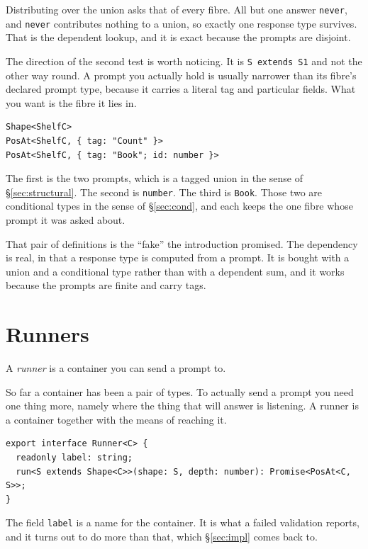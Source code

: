\documentclass[11pt,a4paper]{article}
\begin{document}
\begin{pinkbox}
Distributing over the union asks that of every fibre. All but one answer \texttt{never}, and
\texttt{never} contributes nothing to a union, so exactly one response type survives. That is the
dependent lookup, and it is exact because the prompts are disjoint.

The direction of the second test is worth noticing. It is \texttt{S extends S1} and not the other
way round. A prompt you actually hold is usually narrower than its fibre's declared prompt type,
because it carries a literal tag and particular fields. What you want is the fibre it lies in.

\begin{lstlisting}[language=TS]
Shape<ShelfC>
PosAt<ShelfC, { tag: "Count" }>
PosAt<ShelfC, { tag: "Book"; id: number }>
\end{lstlisting}

The first is the two prompts, which is a tagged union in the sense of \S\ref{sec:structural}. The
second is \texttt{number}. The third is \texttt{Book}. Those two are conditional types in the sense
of \S\ref{sec:cond}, and each keeps the one fibre whose prompt it was asked about.

That pair of definitions is the ``fake'' the introduction promised. The dependency is real, in that a response
type is computed from a prompt. It is bought with a union and a conditional type rather than with a
dependent sum, and it works because the prompts are finite and carry tags.
\end{pinkbox}

\newpage

\section{Runners}
\label{sec:runner}

A \emph{runner} is a container you can send a prompt to.

So far a container has been a pair of types. To actually send a prompt you need one thing more,
namely where the thing that will answer is listening. A runner is a container together with the
means of reaching it.

\begin{lstlisting}[language=TS]
export interface Runner<C> {
  readonly label: string;
  run<S extends Shape<C>>(shape: S, depth: number): Promise<PosAt<C, S>>;
}
\end{lstlisting}

The field \texttt{label} is a name for the container. It is what a failed validation reports, and
it turns out to do more than that, which \S\ref{sec:impl} comes back to.
\end{document}
